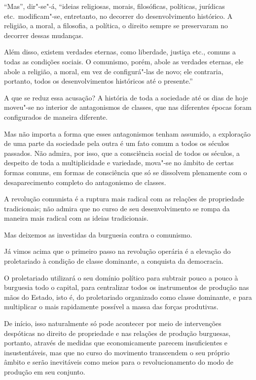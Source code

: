 “Mas”, dir"-se"-á, “ideias religiosas, morais, filosóficas, políticas,
jurídicas etc.~modificam"-se, entretanto, no decorrer do
desenvolvimento histórico. A religião, a moral, a filosofia, a
política, o direito sempre se preservaram no decorrer dessas mudanças.

Além disso, existem verdades eternas, como liberdade, justiça etc.,
comuns a todas as condições sociais. O comunismo, porém, abole as
verdades eternas, ele abole a religião, a moral, em vez de
configurá"-las de novo; ele contraria, portanto, todos os
desenvolvimentos históricos até o presente.”

A que se reduz essa acusação? A história de toda a sociedade até os dias
de hoje moveu"-se no interior de antagonismos de classes, que nas
diferentes épocas foram configurados de maneira diferente.

Mas não importa a forma que esses antagonismos tenham assumido, a
exploração de uma parte da sociedade pela outra é um fato comum a todos
os séculos passados. Não admira, por isso, que a consciência social de
todos os séculos, a despeito de toda a multiplicidade e variedade,
mova"-se no âmbito de certas formas comuns, em formas de consciência
que só se dissolvem plenamente com o desaparecimento completo do
antagonismo de classes.

A revolução comunista é a ruptura mais radical com as relações de
propriedade tradicionais; não admira que no curso de seu
desenvolvimento se rompa da maneira mais radical com as ideias
tradicionais.

Mas deixemos as investidas da burguesia contra o comunismo.

Já vimos acima que o primeiro passo na revolução operária é a elevação
do proletariado à condição de classe dominante, a conquista da
democracia.

O proletariado utilizará o seu domínio político para subtrair pouco a
pouco à burguesia todo o capital, para centralizar todos os
instrumentos de produção nas mãos do Estado, isto é, do proletariado
organizado como classe dominante, e para multiplicar o mais rapidamente
possível a massa das forças produtivas.

De início, isso naturalmente só pode acontecer por meio de intervenções
despóticas no direito de propriedade e nas relações de produção
burguesas, portanto, através de medidas que economicamente parecem
insuficientes e insustentáveis, mas que no curso do movimento
transcendem o seu próprio âmbito e serão inevitáveis como meios para o
revolucionamento do modo de produção em seu conjunto.

